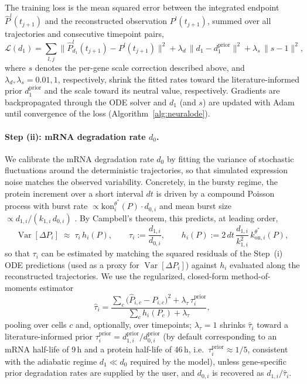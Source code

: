\documentclass[a4paper, 11pt]{article}
\theoremstyle{plain}
\theoremstyle{remark}
\newcommand*{\firstreview}[1]{{\color{black}#1}}
\begin{document}
\firstreview{The training loss is the mean squared error between the integrated endpoint $\hat P^l(t_{j+1})$ and the reconstructed observation $P^l(t_{j+1})$, summed over all trajectories and consecutive timepoint pairs,
\begin{equation}
\mathcal{L}(d_1) = \sum_{l,j} \big\| \hat P^l_{d_1}(t_{j+1}) - P^l(t_{j+1}) \big\|^2
+ \lambda_{d}\,\|d_1 - d_1^{\mathrm{prior}}\|^2
+ \lambda_{s}\,\|s - 1\|^2,
\label{eq:neuralode_loss}
\end{equation}
where $s$ denotes the per-gene scale correction described above, and $\lambda_d,\lambda_s = 0.01, 1$, respectively, shrink the fitted rates toward the literature-informed prior $d_1^{\mathrm{prior}}$ and the scale toward its neutral value, respectively. Gradients are backpropagated through the ODE solver and $d_1$ (and $s$) are updated with Adam until convergence of the loss (Algorithm~\ref{alg:neuralode}).}

\paragraph{Step (ii): mRNA degradation rate $d_0$.}
We calibrate the mRNA degradation rate $d_0$ by fitting the variance of stochastic fluctuations around the deterministic trajectories, so that simulated expression noise matches the observed variability. \firstreview{Concretely, in the bursty regime, the protein increment over a short interval $dt$ is driven
by a compound Poisson process with burst rate $\propto \mathrm{kon}_i^{\theta^*}(P)\cdot d_{0,i}$
and mean burst size $\propto d_{1,i}/(k_{1,i}\,d_{0,i})$ \cite{ventre2022reverse}. By Campbell's theorem, this predicts,
at leading order,
\begin{equation}
\operatorname{Var}[\Delta P_i] \;\approx\; \tau_i \, h_i(P), \qquad
\tau_i := \frac{d_{1,i}}{d_{0,i}}, \qquad
h_i(P) := 2\,dt\,\frac{d_{1,i}}{k_{1,i}^2}\,k_{\mathrm{on},i}^{\theta^*}(P),
\label{eq:eps_moment}
\end{equation}
so that $\tau_i$ can be estimated by matching the squared residuals of the Step~(i) ODE predictions (used as a proxy for $\operatorname{Var}[\Delta P_i]$) against $h_i$ evaluated along the reconstructed trajectories. We use the regularized, closed-form method-of-moments estimator
\begin{equation}
\hat\tau_i = \frac{\sum_{c} \big(\hat P_{i,c} - P_{i,c}\big)^2 + \lambda_\tau\, \tau_i^{\mathrm{prior}}}
{\sum_{c} h_i(P_c) + \lambda_\tau},
\label{eq:eps_estimator}
\end{equation}
pooling over cells $c$ and, optionally, over timepoints; $\lambda_\tau = 1$ shrinks
$\hat\tau_i$ toward a literature-informed prior $\tau_i^{\mathrm{prior}} =
d_{1,i}^{\mathrm{prior}}/d_{0,i}^{\mathrm{prior}}$ (by default corresponding to an mRNA
half-life of 9\,h and a protein half-life of 46\,h, i.e.\ $\tau_i^{\mathrm{prior}}
\approx 1/5$, consistent with the adiabatic regime $d_1 \ll d_0$ required by the model), unless gene-specific prior degradation rates are
supplied by the user, and $d_{0,i}$ is recovered as $d_{1,i}/\hat\tau_i$.
}
\end{document}
